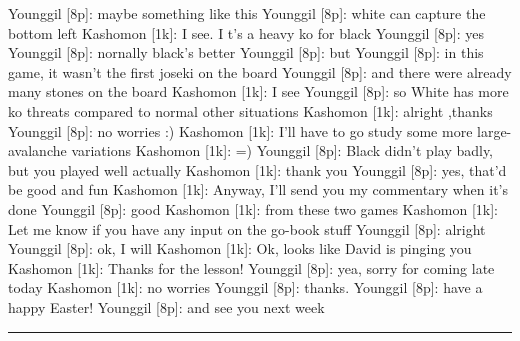 \documentclass[letterpaper,12pt]{memoir}
\begin{document}
\begin{minipage}[t]{0.5\textwidth}
\setlength{\parskip}{0.5em}
Younggil [8p]: maybe something like this
Younggil [8p]: white can capture the bottom left
Kashomon [1k]: I see. I t's a heavy ko for  black
Younggil [8p]: yes
Younggil [8p]: nornally black's better
Younggil [8p]: but
Younggil [8p]: in this game, it wasn't the first joseki on the board
Younggil [8p]: and there were already many stones on the board
Kashomon [1k]: I see
Younggil [8p]: so White has more ko threats compared to normal other situations
Kashomon [1k]: alright ,thanks
Younggil [8p]: no worries :)
Kashomon [1k]: I'll have to go study some more large-avalanche variations
Kashomon [1k]: =)
Younggil [8p]: Black didn't play badly, but you played well actually
Kashomon [1k]: thank you
Younggil [8p]: yes, that'd be good and fun
Kashomon [1k]: Anyway, I'll send you my commentary when it's done
Younggil [8p]: good
Kashomon [1k]: from these two games
Kashomon [1k]: Let me know if you have any input on the go-book stuff
Younggil [8p]: alright
Younggil [8p]: ok, I will
Kashomon [1k]: Ok, looks like David is pinging you
Kashomon [1k]: Thanks for the lesson!
Younggil [8p]: yea, sorry for coming late today
Kashomon [1k]: no worries
Younggil [8p]: thanks. 
Younggil [8p]: have a happy Easter!
Younggil [8p]: and see you next week


\end{minipage}
\vfill

\rule{\textwidth}{0.5pt}
\end{document}
